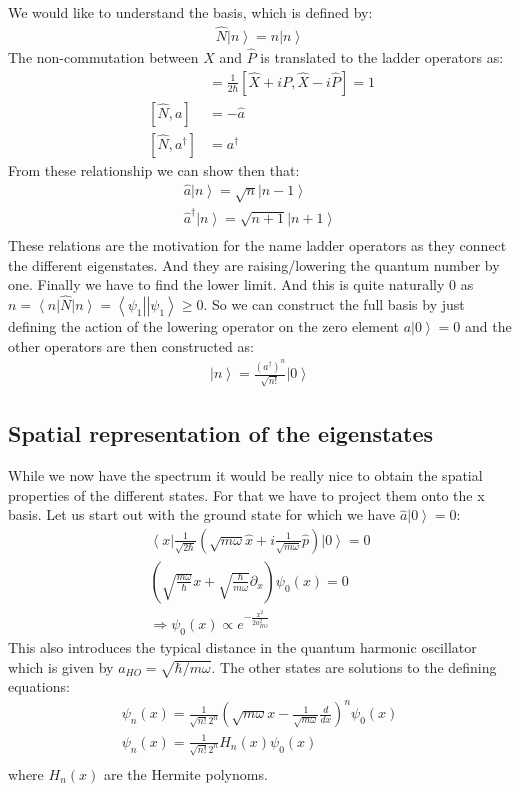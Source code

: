 \documentclass[10pt]{article}
\newcommand{\bra}[1]{\ensuremath{\left\langle#1\right|}}
\newcommand{\ket}[1]{\ensuremath{\left|#1\right\rangle}}
\begin{document}
We would like to understand the basis, which is defined by:
\begin{align}
\hat{N} \ket{n} = n \ket{n}
\end{align}
The non-commutation between $\hat{X}$ and $\hat{P}$ is translated to the ladder operators as:
\begin{align}
[\hat{a}, \hat{a}^\dag] &= \frac{1}{2\hbar}[\hat{X}+iP,\hat{X}-i\hat{P}] = 1\\
~[\hat{N}, a] &= -\hat{a}\\
~[\hat{N}, a^\dag] &= a^\dag
\end{align}
From these relationship we can show then that:
\begin{align}
\hat{a}\ket{n} = \sqrt{n}\ket{n-1}\\
\hat{a}^\dag \ket{n} = \sqrt{n+1}\ket{n+1}\\
\end{align}
These relations are the motivation for the name ladder operators as they connect the different eigenstates. And they are raising/lowering the quantum number by one. Finally we have to find the lower limit. And this is quite naturally 0 as $n = \bra{n}\hat{N}\ket{n} = \bra{\psi_1}\ket{\psi_1}\geq 0$. So we can construct the full basis by just defining the action of the lowering operator on the zero element $a\ket{0} = 0$ and the other operators are then constructed as:
\begin{align}
\ket{n} = \frac{(a^\dag)^n}{\sqrt{n!}}\ket{0}
\end{align}

\subsection{Spatial representation of the eigenstates}

While we now have the spectrum it would be really nice to obtain the spatial properties of the different states. For that we have to project them onto the x basis. Let us start out with the ground state for which we have $\hat{a}\ket{0}= 0$:
\begin{align}
\bra{x}\frac{1}{\sqrt{2\hbar}}\left(\sqrt{m\omega}\hat{x} +i \frac{1}{\sqrt{m\omega}}\hat{p}\right)\ket{0}= 0\\
\left(\sqrt{\frac{m\omega}{\hbar}}x + \sqrt{\frac{\hbar}{m\omega}}\partial_x\right)\psi_0(x)= 0\\
\Rightarrow \psi_0(x) \propto e^{-\frac{x^2}{2a_{HO}^2}}
\end{align}
This also introduces the typical distance in the quantum harmonic oscillator which is given by $a_{HO} =\sqrt{\hbar/m\omega}$. The other states are solutions to the defining equations:
\begin{align}
\psi_n(x) = \frac{1}{\sqrt{n!}2^n}\left(\sqrt{m\omega}x - \frac{1}{\sqrt{m\omega}}\frac{d}{dx}\right)^n \psi_0(x)\\
\psi_n(x) = \frac{1}{\sqrt{n!}2^n}H_n(x) \psi_0(x)\\
\end{align}
where $H_n(x)$ are the Hermite polynoms.
\end{document}
